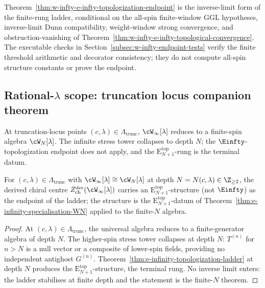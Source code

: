 \begin{remark}
\label{rem:endpoint-versus-finite-rungs}
Theorem~\ref{thm:w-infty-e-infty-topologization-endpoint} is the
inverse-limit form of the finite-rung ladder, conditional on the
all-spin finite-window GGL hypotheses, inverse-limit Dunn
compatibility, weight-window strong convergence, and
obstruction-vanishing of
Theorem~\ref{thm:w-infty-e-infty-topological-convergence}. The
executable checks in
Section~\ref{subsec:w-infty-endpoint-tests} verify the finite
threshold arithmetic and decorator consistency; they do not
compute all-spin structure constants or prove the endpoint.
\end{remark}

\subsection{Rational-\texorpdfstring{$\lambda$}{lambda} scope:
truncation locus companion theorem}
\label{subsec:rational-lambda-scope}

At truncation-locus points
$(c, \lambda) \in \Lambda_{\mathrm{trunc}}$,
$\cW_\infty[\lambda]$ reduces to a finite-spin algebra
$\cW_N[\lambda]$. The infinite stress tower collapses to depth
$N$; the $\Einfty$-topologization endpoint does not apply, and
the $\mathrm{E}_{N+1}^{\mathrm{top}}$-rung is the terminal datum.

\begin{theorem}
\label{thm:truncation-locus-companion}
For $(c, \lambda) \in \Lambda_{\mathrm{trunc}}$ with
$\cW_\infty[\lambda] \cong \cW_N[\lambda]$ at depth $N =
N(c, \lambda) \in \Z_{\ge 2}$, the derived chiral centre
$Z^{\mathrm{der}}_{\mathrm{ch}}(\cW_\infty[\lambda])$ carries an
$\mathrm{E}_{N+1}^{\mathrm{top}}$-structure (not $\Einfty$) as the
endpoint of the ladder; the structure is the
$\mathrm{E}_{N+1}^{\mathrm{top}}$-datum of
Theorem~\textup{\ref{thm:e-infinity-specialisation-WN}} applied to
the finite-$N$ algebra.
\end{theorem}

\begin{proof}
At $(c, \lambda) \in \Lambda_{\mathrm{trunc}}$, the universal
algebra reduces to a finite-generator algebra of depth $N$. The
higher-spin stress tower collapses at depth $N$: $T^{(n)}$ for
$n > N$ is a null vector or a composite of lower-spin fields,
providing no independent antighost $G^{(n)}$.
Theorem~\ref{thm:e-infinity-topologization-ladder} at depth $N$
produces the $\mathrm{E}_{N+1}^{\mathrm{top}}$-structure, the
terminal rung. No inverse limit enters: the ladder stabilises at
finite depth and the statement is the finite-$N$ theorem.
\end{proof}

